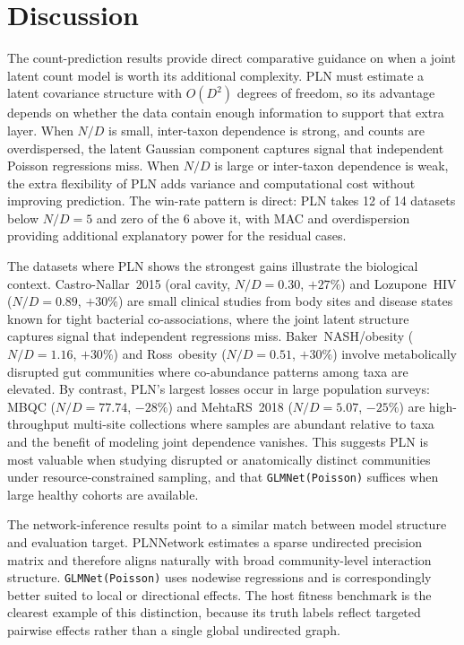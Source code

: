 \documentclass[Review,doublespace,sageh,times]{sagej}
\begin{document}
\section{Discussion}
\label{sec:discussion}

The count-prediction results provide direct comparative guidance on when a joint latent count model is worth its additional complexity.
PLN must estimate a latent covariance structure with $O(D^2)$ degrees of freedom, so its advantage depends on whether the data contain enough information to support that extra layer.
When $N/D$ is small, inter-taxon dependence is strong, and counts are overdispersed, the latent Gaussian component captures signal that independent Poisson regressions miss.
When $N/D$ is large or inter-taxon dependence is weak, the extra flexibility of PLN adds variance and computational cost without improving prediction.
The win-rate pattern is direct: PLN takes 12 of 14 datasets below $N/D = 5$ and zero of the 6 above it, with MAC and overdispersion providing additional explanatory power for the residual cases.

The datasets where PLN shows the strongest gains illustrate the biological context.
Castro-Nallar~2015 (oral cavity, $N/D = 0.30$, $+27\%$) and Lozupone~HIV ($N/D = 0.89$, $+30\%$) are small clinical studies from body sites and disease states known for tight bacterial co-associations, where the joint latent structure captures signal that independent regressions miss.
Baker~NASH/obesity ($N/D = 1.16$, $+30\%$) and Ross~obesity ($N/D = 0.51$, $+30\%$) involve metabolically disrupted gut communities where co-abundance patterns among taxa are elevated.
By contrast, PLN's largest losses occur in large population surveys: MBQC ($N/D = 77.74$, $-28\%$) and MehtaRS~2018 ($N/D = 5.07$, $-25\%$) are high-throughput multi-site collections where samples are abundant relative to taxa and the benefit of modeling joint dependence vanishes.
This suggests PLN is most valuable when studying disrupted or anatomically distinct communities under resource-constrained sampling, and that \texttt{GLMNet(Poisson)} suffices when large healthy cohorts are available.

The network-inference results point to a similar match between model structure and evaluation target.
PLNNetwork estimates a sparse undirected precision matrix and therefore aligns naturally with broad community-level interaction structure.
\texttt{GLMNet(Poisson)} uses nodewise regressions and is correspondingly better suited to local or directional effects.
The host fitness benchmark is the clearest example of this distinction, because its truth labels reflect targeted pairwise effects rather than a single global undirected graph.
\end{document}
